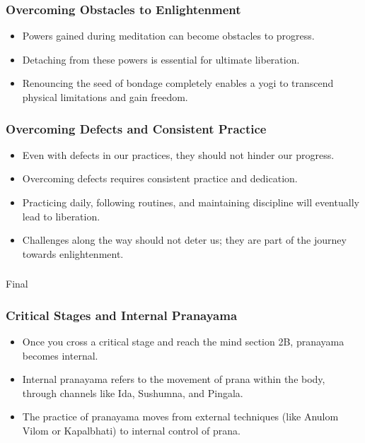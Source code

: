 \begin{frame}[fragile]\frametitle{Overcoming Obstacles to Enlightenment}
    \begin{itemize}
        \item Powers gained during meditation can become obstacles to progress.
        \item Detaching from these powers is essential for ultimate liberation.
        \item Renouncing the seed of bondage completely enables a yogi to transcend physical limitations and gain freedom.
    \end{itemize}
\end{frame}

\begin{frame}[fragile]\frametitle{Overcoming Defects and Consistent Practice}
    \begin{itemize}
        \item Even with defects in our practices, they should not hinder our progress.
        \item Overcoming defects requires consistent practice and dedication.
        \item Practicing daily, following routines, and maintaining discipline will eventually lead to liberation.
        \item Challenges along the way should not deter us; they are part of the journey towards enlightenment.
    \end{itemize}
\end{frame}


\begin{frame}[fragile]\frametitle{}
\begin{center}
{\Large Final}
\end{center}
\end{frame}

\begin{frame}[fragile]\frametitle{Critical Stages and Internal Pranayama}
    \begin{itemize}
        \item Once you cross a critical stage and reach the mind section 2B, pranayama becomes internal.
        \item Internal pranayama refers to the movement of prana within the body, through channels like Ida, Sushumna, and Pingala.
        \item The practice of pranayama moves from external techniques (like Anulom Vilom or Kapalbhati) to internal control of prana.
    \end{itemize}
\end{frame}

